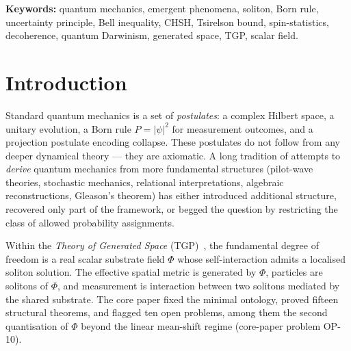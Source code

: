 \documentclass[11pt,a4paper]{article}
\renewcommand{\Phi}{\varPhi}
\begin{document}
\noindent\textbf{Keywords:}
quantum mechanics, emergent phenomena, soliton, Born rule, uncertainty
principle, Bell inequality, CHSH, Tsirelson bound, spin-statistics,
decoherence, quantum Darwinism, generated space, TGP, scalar field.

\tableofcontents
\newpage

\section{Introduction}\label{sec:intro}

Standard quantum mechanics is a set of \emph{postulates}: a complex
Hilbert space, a unitary evolution, a Born rule $P=|\psi|^{2}$ for
measurement outcomes, and a projection postulate encoding collapse.
These postulates do not follow from any deeper dynamical theory ---
they are axiomatic. A long tradition of attempts to \emph{derive}
quantum mechanics from more fundamental structures (pilot-wave
theories, stochastic mechanics, relational interpretations, algebraic
reconstructions, Gleason's theorem) has either introduced additional
structure, recovered only part of the framework, or begged the
question by restricting the class of allowed probability assignments.

Within the \emph{Theory of Generated Space} (TGP)~\cite{TGP-core}, the
fundamental degree of freedom is a real scalar substrate field $\Phi$
whose self-interaction admits a localised soliton solution. The
effective spatial metric is generated by $\Phi$, particles are
solitons of $\Phi$, and measurement is interaction between two
solitons mediated by the shared substrate. The core paper fixed the
minimal ontology, proved fifteen structural theorems, and flagged ten
open problems, among them the second quantisation of $\Phi$ beyond
the linear mean-shift regime (core-paper problem OP-10).
\end{document}
